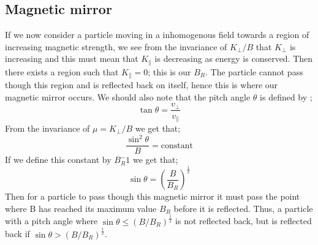 \documentclass[14paper,11pt,hidelinks]{article}
\begin{document}
\subsection{Magnetic mirror}
If we now consider a particle moving in a inhomogenous field towards a region of increasing magnetic strength, we see from the invariance of  \begin{math} K_\bot/B\end{math} that \begin{math} K_\bot \end{math} is increasing and this must mean that \begin{math} K_\parallel \end{math} is decreasing as energy is conserved. Then there exists a region such that \begin{math} K_\parallel=0 \end{math}; this is our \begin{math} B_R \end{math}. The particle cannot pass though this region and is reflected back on itself, hence this is where our magnetic mirror occurs. We should also note that the pitch angle \begin{math} \theta  \end{math} is defined by \citep{boyd_physics_2003};
\begin{equation}
\tan\theta=\frac{v_\bot}{v_\parallel}
\end{equation}
From the invariance of \begin{math} \mu=K_\bot/B \end{math} we get that;
\begin{equation} 
\frac{\sin^2\theta}{B} =\mbox{constant}
\end{equation}
If we define this constant by \begin{math} B_R^-1\end{math} we get that;
\begin{equation}
\sin\theta=\left(\frac{B}{B_R}\right)^\frac{1}{2}
\end{equation}
Then for a particle to pass though this magnetic mirror it must pass the point where B has reached its maximum value \begin{math} B_R \end{math} before it is reflected. Thus, a particle with a pitch angle where \begin{math} \sin\theta\leq(B/B_R)^\frac{1}{2}\end{math} is not reflected back, but is reflected back if \begin{math} \sin\theta>(B/B_R)^\frac{1}{2}\end{math}.
\end{document}
